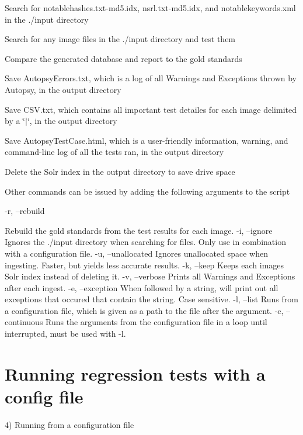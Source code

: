\begin{DoxyItemize}
\item Search for notablehashes.\+txt-\/md5.\+idx, nsrl.\+txt-\/md5.\+idx, and notablekeywords.\+xml in the ./input directory
\item Search for any image files in the ./input directory and test them
\item Compare the generated database and report to the gold standards
\item Save Autopsy\+Errors.\+txt, which is a log of all Warnings and Exceptions thrown by Autopsy, in the output directory
\item Save C\+S\+V.\+txt, which contains all important test detailes for each image delimited by a \char`\"{}$\vert$\char`\"{}, in the output directory
\item Save Autopsy\+Test\+Case.\+html, which is a user-\/friendly information, warning, and command-\/line log of all the tests ran, in the output directory
\item Delete the Solr index in the output directory to save drive space
\end{DoxyItemize}

Other commands can be issued by adding the following arguments to the script \begin{DoxyVerb}-r, --rebuild
\end{DoxyVerb}
 Rebuild the gold standards from the test results for each image. -\/i, --ignore Ignores the ./input directory when searching for files. Only use in combination with a configuration file. -\/u, --unallocated Ignores unallocated space when ingesting. Faster, but yields less accurate results. -\/k, --keep Keeps each image\textquotesingle{}s Solr index instead of deleting it. -\/v, --verbose Prints all Warnings and Exceptions after each ingest. -\/e, --exception When followed by a string, will print out all exceptions that occured that contain the string. Case sensitive. -\/l, --list Runs from a configuration file, which is given as a path to the file after the argument. -\/c, --continuous Runs the arguments from the configuration file in a loop until interrupted, must be used with -\/l.\hypertarget{regression_test_page_regression_test_config}{}\section{Running regression tests with a config file}\label{regression_test_page_regression_test_config}
4) Running from a configuration file


